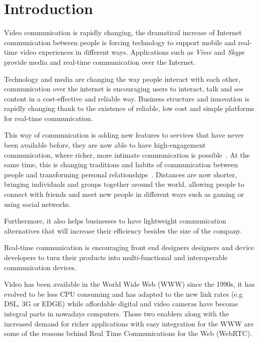 \section{Introduction}

\thispagestyle{empty}

Video communication is rapidly changing, the dramatical increase of Internet communication between people is forcing technology to support mobile and real-time video experiences in different ways. Applications such as {\it Vime} and {\it Skype} provide media and real-time communication over the Internet. 

Technology and media are changing the way people interact with each other, communication over the internet is encouraging users to interact, talk and see content in a cost-effective and reliable way. Business structure and innovation is rapidly changing thank to the existence of reliable, low cost and simple platforms for real-time communication.

This way of communication is adding new features to services that have never been available before, they are now able to have high-engagement communication, where richer, more intimate communication is possible~\cite{futureRTC}. At the same time, this is changing traditions and habits of communication between people and transforming personal relationships~\cite{socialrelationships}. Distances are now shorter, bringing individuals and groups together around the world, allowing people to connect with friends and meet new people in different ways such as gaming or using social networks.

Furthermore, it also helps businesses to have lightweight communication alternatives that will increase their efficiency besides the size of the company. 

Real-time communication is encouraging front end designers designers and device developers to turn their products into multi-functional and interoperable communication devices.

Video has been available in the World Wide Web (WWW) since the 1990s, it has evolved to be less CPU consuming and has adapted to the new link rates (e.g DSL, 3G or EDGE) while affordable digital and video cameras have become integral parts in nowadays computers. Those two enablers along with the increased demand for richer applications with easy integration for the WWW are some of the reasons behind Real Time Communications for the Web (WebRTC).

